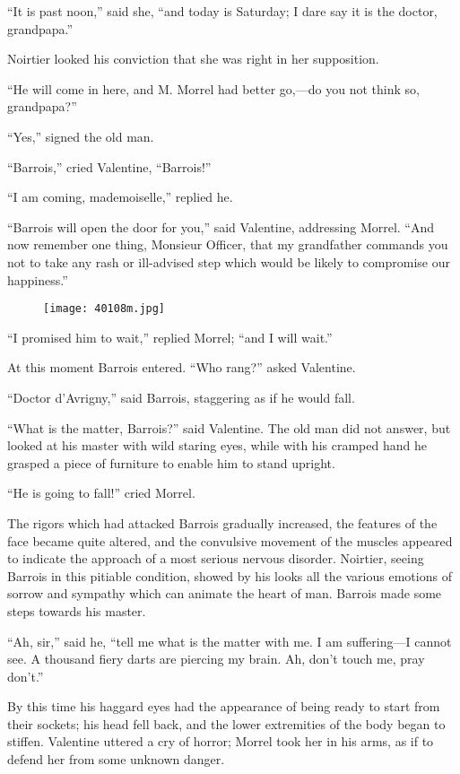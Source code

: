 “It is past noon,” said she, “and today is Saturday; I dare say it is
the doctor, grandpapa.”

Noirtier looked his conviction that she was right in her supposition.

“He will come in here, and M. Morrel had better go,—do you not think
so, grandpapa?”

“Yes,” signed the old man.

“Barrois,” cried Valentine, “Barrois!”

“I am coming, mademoiselle,” replied he.

“Barrois will open the door for you,” said Valentine, addressing
Morrel. “And now remember one thing, Monsieur Officer, that my
grandfather commands you not to take any rash or ill-advised step which
would be likely to compromise our happiness.”

\begin{figure}[ht]
\texttt{[image: 40108m.jpg]}
\end{figure}

“I promised him to wait,” replied Morrel; “and I will wait.”

At this moment Barrois entered. “Who rang?” asked Valentine.

“Doctor d’Avrigny,” said Barrois, staggering as if he would fall.

“What is the matter, Barrois?” said Valentine. The old man did not
answer, but looked at his master with wild staring eyes, while with his
cramped hand he grasped a piece of furniture to enable him to stand
upright.

“He is going to fall!” cried Morrel.

The rigors which had attacked Barrois gradually increased, the features
of the face became quite altered, and the convulsive movement of the
muscles appeared to indicate the approach of a most serious nervous
disorder. Noirtier, seeing Barrois in this pitiable condition, showed
by his looks all the various emotions of sorrow and sympathy which can
animate the heart of man. Barrois made some steps towards his master.

“Ah, sir,” said he, “tell me what is the matter with me. I am
suffering—I cannot see. A thousand fiery darts are piercing my brain.
Ah, don’t touch me, pray don’t.”

By this time his haggard eyes had the appearance of being ready to
start from their sockets; his head fell back, and the lower extremities
of the body began to stiffen. Valentine uttered a cry of horror; Morrel
took her in his arms, as if to defend her from some unknown danger.

